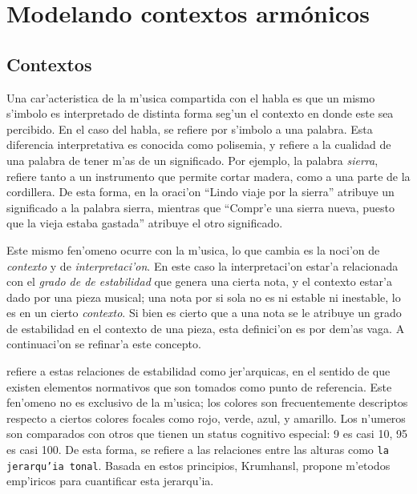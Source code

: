 \section{Modelando contextos arm\'onicos}
\label{sec:harmonic_contexts}
\subsection{Contextos}
Una car'acteristica de la m'usica compartida con el habla es que un mismo s'imbolo es interpretado de distinta forma seg'un el contexto
en donde este sea percibido. En el caso del habla, se refiere por s'imbolo a una palabra. Esta diferencia interpretativa es conocida 
como polisemia, y refiere a la cualidad de una palabra de tener m'as de un significado. Por ejemplo, la palabra \emph{sierra}, refiere
tanto a un instrumento que permite cortar madera, como a una parte de la cordillera. De esta forma, en la oraci'on 
``Lindo viaje por la sierra'' atribuye un significado a la palabra sierra, mientras que ``Compr'e una sierra nueva, puesto que la vieja 
estaba gastada'' atribuye el otro significado. 

Este mismo fen'omeno ocurre con la m'usica, lo que cambia es la noci'on de \emph{contexto} y de \emph{interpretaci'on}. En este caso
la interpretaci'on estar'a relacionada con el \emph{grado de de estabilidad} que genera una cierta nota, y el contexto estar'a dado por
una pieza musical; una nota por si sola no es ni estable ni inestable, lo es en un cierto \emph{contexto}. Si bien es cierto que a una nota
se le atribuye un grado de estabilidad en el contexto de una pieza, esta definici'on es por dem'as vaga. A continuaci'on se refinar'a
este concepto.

\cite{Krumhansl90} refiere a estas relaciones de estabilidad como jer'arquicas, en el sentido de que existen elementos normativos que son tomados 
como punto de referencia. Este fen'omeno no es exclusivo de la m'usica; los colores son frecuentemente descriptos respecto a ciertos colores 
focales como rojo, verde, azul, y amarillo. Los n'umeros son comparados con otros que tienen un status cognitivo especial: 9 es casi 10, 95 es casi 100. 
De esta forma, se refiere a las relaciones entre las alturas como \texttt{la jerarqu'ia tonal}. Basada en estos principios, Krumhansl, 
propone m'etodos emp'iricos para cuantificar esta jerarqu'ia.



